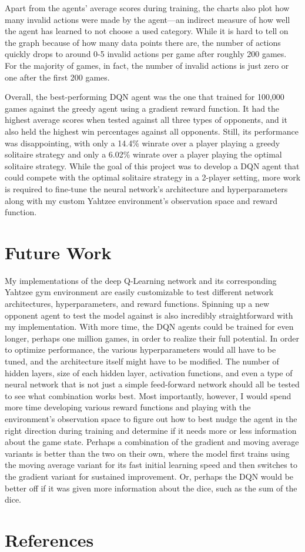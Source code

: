 \documentclass[12pt]{article}
\begin{document}
Apart from the agents' average scores during training, the charts also plot how many invalid actions were made by the agent—an indirect measure of how well the agent has learned to not choose a used category. While it is hard to tell on the graph because of how many data points there are, the number of actions quickly drops to around 0-5 invalid actions per game after roughly 200 games. For the majority of games, in fact, the number of invalid actions is just zero or one after the first 200 games.

Overall, the best-performing DQN agent was the one that trained for 100,000 games against the greedy agent using a gradient reward function. It had the highest average scores when tested against all three types of opponents, and it also held the highest win percentages against all opponents. Still, its performance was disappointing, with only a 14.4\% winrate over a player playing a greedy solitaire strategy and only a 6.02\% winrate over a player playing the optimal solitaire strategy. While the goal of this project was to develop a DQN agent that could compete with the optimal solitaire strategy in a 2-player setting, more work is required to fine-tune the neural network's architecture and hyperparameters along with my custom Yahtzee environment's observation space and reward function.

\section{Future Work}
My implementations of the deep Q-Learning network and its corresponding Yahtzee gym environment are easily customizable to test different network architectures, hyperparameters, and reward functions. Spinning up a new opponent agent to test the model against is also incredibly straightforward with my implementation. With more time, the DQN agents could be trained for even longer, perhaps one million games, in order to realize their full potential. In order to optimize performance, the various hyperparameters would all have to be tuned, and the architecture itself might have to be modified. The number of hidden layers, size of each hidden layer, activation functions, and even a type of neural network that is not just a simple feed-forward network should all be tested to see what combination works best. Most importantly, however, I would spend more time developing various reward functions and playing with the environment's observation space to figure out how to best nudge the agent in the right direction during training and determine if it needs more or less information about the game state. Perhaps a combination of the gradient and moving average variants is better than the two on their own, where the model first trains using the moving average variant for its fast initial learning speed and then switches to the gradient variant for sustained improvement. Or, perhaps the DQN would be better off if it was given more information about the dice, such as the sum of the dice. 



\newpage

\section{References}
\printbibliography[heading=none]
\end{document}
